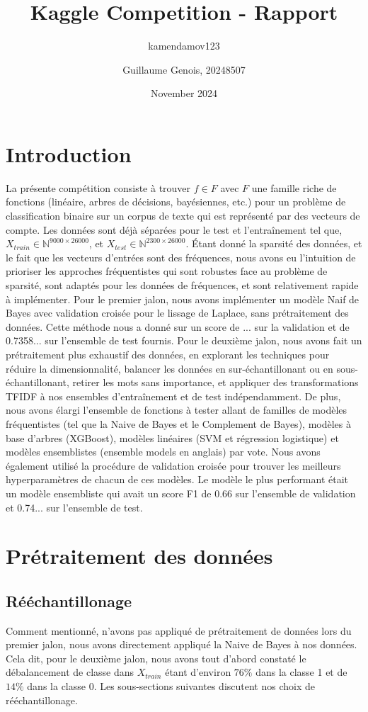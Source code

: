 \documentclass{article}
\title{Kaggle Competition - Rapport}
\author{kamendamov123 }
\author{Guillaume Genois, 20248507}
\date{November 2024}
\begin{document}
\maketitle

\section{Introduction}
La présente compétition consiste à trouver $f \in F$ avec $F$ une famille riche de fonctions (linéaire, arbres de décisions, bayésiennes, etc.) pour un problème de classification binaire sur un corpus de texte qui est représenté par des vecteurs de compte. Les données sont déjà séparées pour le test et l'entraînement tel que, $X_{train} \in \mathbb{N}^{9000 \times 26000}$, et $X_{test} \in \mathbb{N}^{2300 \times 26000}$. Étant donné la sparsité des données, et le fait que les vecteurs d'entrées sont des fréquences, nous avons eu l'intuition de prioriser les approches fréquentistes qui sont robustes face au problème de sparsité, sont adaptés pour les données de fréquences, et sont relativement rapide à implémenter. Pour le premier jalon, nous avons implémenter un modèle Naif de Bayes avec validation croisée pour le lissage de Laplace, sans prétraitement des données. Cette méthode nous a donné sur un score de ... sur la validation et de 0.7358... sur l'ensemble de test fournis. Pour le deuxième jalon, nous avons fait un prétraitement plus exhaustif des données, en explorant les techniques pour réduire la dimensionnalité, balancer les données en sur-échantillonant ou en sous-échantillonant, retirer les mots sans importance, et appliquer des transformations TFIDF à nos ensembles d'entraînement et de test indépendamment. De plus, nous avons élargi l'ensemble de fonctions à tester allant de familles de modèles fréquentistes (tel que la Naive de Bayes et le Complement de Bayes), modèles à base d'arbres (XGBoost), modèles linéaires (SVM et régression logistique) et modèles ensemblistes (ensemble models en anglais) par vote. Nous avons également utilisé la procédure de validation croisée pour trouver les meilleurs hyperparamètres de chacun de ces modèles. Le modèle le plus performant était un modèle ensembliste qui avait un score F1 de 0.66 sur l'ensemble de validation et 0.74... sur l'ensemble de test.    

\section{Prétraitement des données}
\subsection{Rééchantillonage}
Comment mentionné, n'avons pas appliqué de prétraitement de données lors du premier jalon, nous avons directement appliqué la Naive de Bayes à nos données. Cela dit, pour le deuxième jalon, nous avons tout d'abord constaté le débalancement de classe dans $X_{train}$ étant d'environ $76\%$ dans la classe 1 et de $14\%$ dans la classe 0. Les sous-sections suivantes discutent nos choix de rééchantillonage.
\end{document}
